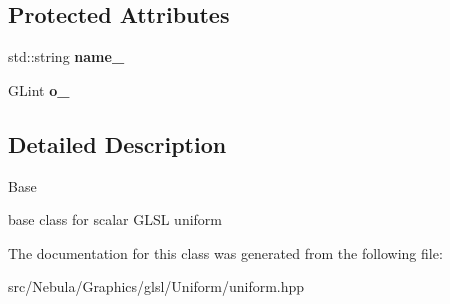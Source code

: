 \subsection*{\-Protected \-Attributes}
\begin{DoxyCompactItemize}
\item 
\hypertarget{classNeb_1_1glsl_1_1Uniform_1_1Scalar_1_1Base_af4f8e92fee448c545de153937a419abe}{std\-::string {\bfseries name\-\_\-}}\label{classNeb_1_1glsl_1_1Uniform_1_1Scalar_1_1Base_af4f8e92fee448c545de153937a419abe}

\item 
\hypertarget{classNeb_1_1glsl_1_1Uniform_1_1Scalar_1_1Base_ac57d0525c2866193e87adde9b8ef36fe}{\-G\-Lint {\bfseries o\-\_\-}}\label{classNeb_1_1glsl_1_1Uniform_1_1Scalar_1_1Base_ac57d0525c2866193e87adde9b8ef36fe}

\end{DoxyCompactItemize}


\subsection{\-Detailed \-Description}
\-Base 

base class for scalar \-G\-L\-S\-L uniform 

\-The documentation for this class was generated from the following file\-:\begin{DoxyCompactItemize}
\item 
src/\-Nebula/\-Graphics/glsl/\-Uniform/uniform.\-hpp\end{DoxyCompactItemize}
